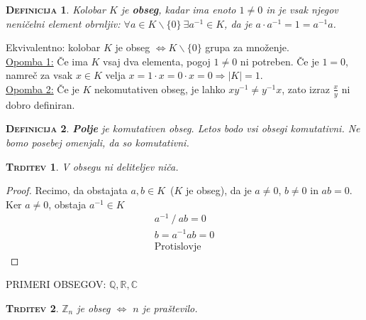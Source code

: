 \documentclass[a4paper,12pt]{article}
\newtheorem*{trditev}{\textsc{Trditev}}
\newtheorem*{definicija}{\textsc{Definicija}}
\begin{document}
\begin{definicija}
Kolobar $K$ je \textbf{obseg}, kadar ima enoto $1\neq 0$ in je vsak njegov neničelni element obrnljiv: $\forall a \in K \backslash \{0\} ~ \exists a^{-1}\in K$, da je $a\cdot a^{-1}=1=a^{-1}a$.\\
\end{definicija}

\noindent Ekvivalentno: kolobar $K$ je obseg $\Leftrightarrow K\backslash \{0\}$ grupa za množenje.\\

\noindent \underline{Opomba 1:} Če ima $K$ vsaj dva elementa, pogoj $1\neq0$ ni potreben. Če je $1=0$, namreč za vsak $x\in K$ velja $x=1\cdot x = 0\cdot x=0 \Rightarrow |K| =1$.\\

\noindent \underline{Opomba 2:} Če je $K$ nekomutativen obseg, je lahko $xy^{-1}\neq y^{-1}x$, zato izraz $\frac{x}{y}$ ni dobro definiran.\\

\begin{definicija}
\textbf{Polje} je komutativen obseg. Letos bodo vsi obsegi komutativni. Ne bomo posebej omenjali, da so komutativni.\\
\end{definicija} 

\begin{trditev}
V obsegu ni deliteljev niča.\\
\end{trditev}

\begin{proof}
Recimo, da obstajata $a,b\in K$~($K$ je obseg), da je $a\neq 0$, $b\neq 0$ in $ab=0$. \\

Ker $a\neq 0$, obstaja $a^{-1}\in K$ 
\begin{gather*}
a^{-1} ~ / ~ ab=0 \\
b=a^{-1}ab=0 \\
\text{Protislovje}
\end{gather*}
\end{proof}

\noindent PRIMERI OBSEGOV: $\mathbb{Q},\mathbb{R},\mathbb{C}$\\

\begin{trditev}
$\mathbb{Z}_n$ je obseg $\Leftrightarrow$ $n$ je praštevilo.\\
\end{trditev}
\end{document}
